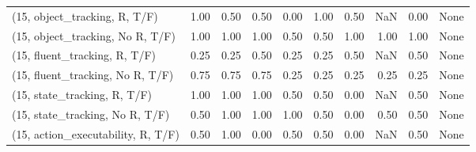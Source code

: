 \begin{table*}[h!]
\begin{adjustbox}{width=2\columnwidth,center}
\begin{tabular}{lrrr|rrr|rrr}
\midrule
(15, object\_tracking, R, T/F)         &                      1.00 &                  0.50 &                      0.50 &                          0.00 &                      1.00 &                          0.50 &                                    NaN &                               0.00 &                                  None \\
(15, object\_tracking, No R, T/F)      &                      1.00 &                  1.00 &                      1.00 &                          0.50 &                      0.50 &                          1.00 &                                   1.00 &                               1.00 &                                  None \\
(15, fluent\_tracking, R, T/F)         &                      0.25 &                  0.25 &                      0.50 &                          0.25 &                      0.25 &                          0.50 &                                    NaN &                               0.50 &                                  None \\
(15, fluent\_tracking, No R, T/F)      &                      0.75 &                  0.75 &                      0.75 &                          0.25 &                      0.25 &                          0.25 &                                   0.25 &                               0.25 &                                  None \\
(15, state\_tracking, R, T/F)          &                      1.00 &                  1.00 &                      1.00 &                          0.50 &                      0.50 &                          0.00 &                                    NaN &                               0.50 &                                  None \\
(15, state\_tracking, No R, T/F)       &                      0.50 &                  1.00 &                      1.00 &                          1.00 &                      0.50 &                          0.00 &                                   0.50 &                               0.50 &                                  None \\
(15, action\_executability, R, T/F)    &                      0.50 &                  1.00 &                      0.00 &                          0.50 &                      0.50 &                          0.00 &                                    NaN &                               0.50 &                                  None \\

\end{tabular}
\end{adjustbox}
\end{table*}
